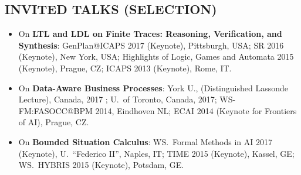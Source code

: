 \vspace{-3ex}
\subsection*{INVITED TALKS (SELECTION)}
\vspace{-3ex}

\begin{itemize}[topsep=0pt,itemsep=-1ex,partopsep=1ex,parsep=1ex]


\item 
On \textbf{LTL and LDL on Finite Traces: Reasoning, Verification, and Synthesis}:
GenPlan@ICAPS 2017 (Keynote), Pittsburgh, USA; SR 2016 (Keynote), New York, USA; Highlights of Logic, Games and Automata 2015 (Keynote), Prague, CZ; ICAPS 2013 (Keynote), Rome, IT.


\item 
On \textbf{Data-Aware Business Processes}:  York U., (Distinguished Lassonde Lecture), Canada, 2017 ; U.\ of Toronto, Canada, 2017; WS-FM:FASOCC@BPM 2014, Eindhoven NL;  ECAI 2014 (Keynote for Frontiers of AI), Prague, CZ. 



\item 
On \textbf{Bounded Situation Calculus}: WS.\ Formal Methods in AI 2017 (Keynote), U.\  ``Federico II'', Naples, IT; TIME 2015 (Keynote), Kassel, GE; WS.\ HYBRIS 2015 (Keynote), Potsdam, GE.  


\end{itemize}
